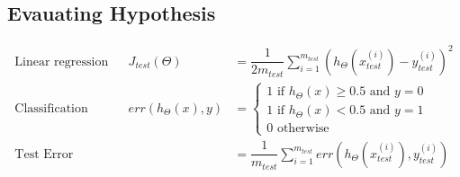 \documentclass[11pt, oneside]{article}
\begin{document}
\subsection{Evauating Hypothesis}
	\begin{align*}
		\text{Linear regression} && 
			J_{test}(\Theta) &= \dfrac{1}{2m_{test}} \sum_{i=1}^{m_{test}}(h_\Theta(x^{(i)}_{test}) - y^{(i)}_{test})^2\\
		\text{Classification} &&
			err(h_\Theta(x),y) &= 
				\begin{cases} 
					1 \text{ if } h_\Theta(x) \geq 0.5 \text{ and } y = 0\\
					1 \text{ if } h_\Theta(x) < 0.5 \text{ and } y = 1\\
					0 \text{ otherwise}
				\end{cases}\\
		\text{Test Error} &&
			&= \dfrac{1}{m_{test}} \sum^{m_{test}}_{i=1} err(h_\Theta(x^{(i)}_{test}), y^{(i)}_{test})
	\end{align*}
	
\end{document}
